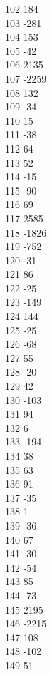 { 102	184 \\
 103	-281 \\
 104	153 \\
 105	-42 \\
 106	2135 \\
 107	-2259 \\
 108	132 \\
 109	-34 \\
 110	15 \\
 111	-38 \\
 112	64 \\
 113	52 \\
 114	-15 \\
 115	-90 \\
 116	69 \\
 117	2585 \\
 118	-1826 \\
 119	-752 \\
 120	-31 \\
 121	86 \\
 122	-25 \\
 123	-149 \\
 124	144 \\
 125	-25 \\
 126	-68 \\
 127	55 \\
 128	-20 \\
 129	42 \\
 130	-103 \\
 131	94 \\
 132	6 \\
 133	-194 \\
 134	38 \\
 135	63 \\
 136	91 \\
 137	-35 \\
 138	1 \\
 139	-36 \\
 140	67 \\
 141	-30 \\
 142	-54 \\
 143	85 \\
 144	-73 \\
 145	2195 \\
 146	-2215 \\
 147	108 \\
 148	-102 \\
 149	51 \\
}
